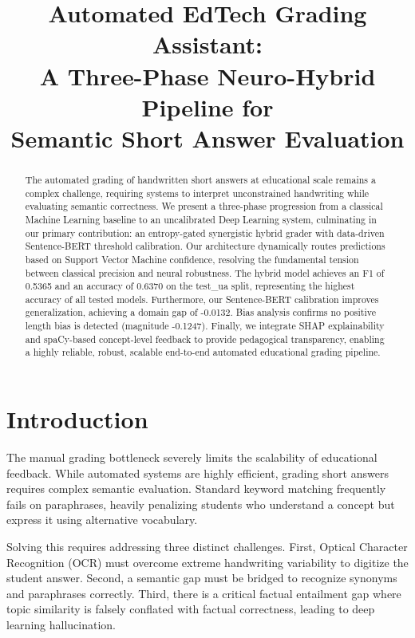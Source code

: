 \documentclass[conference]{IEEEtran}
\title{Automated EdTech Grading Assistant:\\A Three-Phase Neuro-Hybrid Pipeline for\\Semantic Short Answer Evaluation}
\author{
\IEEEauthorblockN{Udita}
\IEEEauthorblockA{\textit{Roll No: 230082}\\
\textit{NST, Rishihood University, Sonipat}\\
\textit{Course: Advanced Machine Learning \& Deep Learning}}
}
\begin{document}
\maketitle

\begin{abstract}
The automated grading of handwritten short answers at educational scale remains a complex challenge, requiring systems to interpret unconstrained handwriting while evaluating semantic correctness. We present a three-phase progression from a classical Machine Learning baseline to an uncalibrated Deep Learning system, culminating in our primary contribution: an entropy-gated synergistic hybrid grader with data-driven Sentence-BERT threshold calibration. Our architecture dynamically routes predictions based on Support Vector Machine confidence, resolving the fundamental tension between classical precision and neural robustness. The hybrid model achieves an F1 of 0.5365 and an accuracy of 0.6370 on the test\_ua split, representing the highest accuracy of all tested models. Furthermore, our Sentence-BERT calibration improves generalization, achieving a domain gap of -0.0132. Bias analysis confirms no positive length bias is detected (magnitude -0.1247). Finally, we integrate SHAP explainability and spaCy-based concept-level feedback to provide pedagogical transparency, enabling a highly reliable, robust, scalable end-to-end automated educational grading pipeline.
\end{abstract}

\section{Introduction}

The manual grading bottleneck severely limits the scalability of educational feedback. While automated systems are highly efficient, grading short answers requires complex semantic evaluation. Standard keyword matching frequently fails on paraphrases, heavily penalizing students who understand a concept but express it using alternative vocabulary. 

Solving this requires addressing three distinct challenges. First, Optical Character Recognition (OCR) must overcome extreme handwriting variability to digitize the student answer. Second, a semantic gap must be bridged to recognize synonyms and paraphrases correctly. Third, there is a critical factual entailment gap where topic similarity is falsely conflated with factual correctness, leading to deep learning hallucination.
\end{document}
